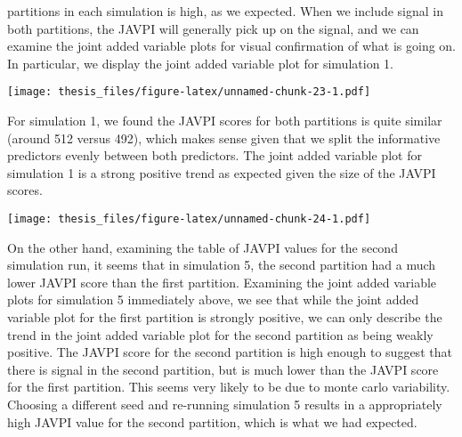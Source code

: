 \documentclass[12pt,twoside]{reedthesis}
\theoremstyle{definition}
\theoremstyle{definition}
\theoremstyle{definition}
\theoremstyle{remark}
\begin{document}
partitions in each simulation is high, as we expected. When we include
signal in both partitions, the JAVPI will generally pick up on the
signal, and we can examine the joint added variable plots for visual
confirmation of what is going on. In particular, we display the joint
added variable plot for simulation 1. \par 
\begin{table}[H]
\centering
{}
\end{table}
\texttt{[image: thesis\_files/figure-latex/unnamed-chunk-23-1.pdf]}

For simulation 1, we found the JAVPI scores for both partitions is quite
similar (around 512 versus 492), which makes sense given that we split
the informative predictors evenly between both predictors. The joint
added variable plot for simulation 1 is a strong positive trend as
expected given the size of the JAVPI scores. \par 

\texttt{[image: thesis\_files/figure-latex/unnamed-chunk-24-1.pdf]}

On the other hand, examining the table of JAVPI values for the second
simulation run, it seems that in simulation 5, the second partition had
a much lower JAVPI score than the first partition. Examining the joint
added variable plots for simulation 5 immediately above, we see that
while the joint added variable plot for the first partition is strongly
positive, we can only describe the trend in the joint added variable
plot for the second partition as being weakly positive. The JAVPI score
for the second partition is high enough to suggest that there is signal
in the second partition, but is much lower than the JAVPI score for the
first partition. This seems very likely to be due to monte carlo
variability. Choosing a different seed and re-running simulation 5
results in a appropriately high JAVPI value for the second partition,
which is what we had expected. \par 
\end{document}
